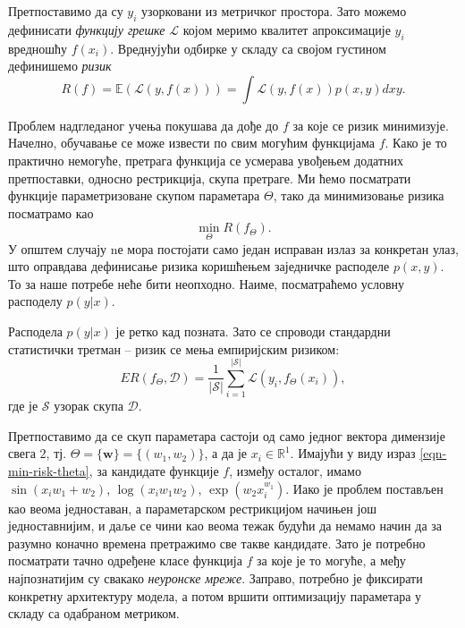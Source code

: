 \documentclass[12pt, a4paper, twoside]{book}
\numberwithin{equation}{chapter}
\numberwithin{theorem}{section}
\numberwithin{definition}{section}
\numberwithin{definitionChapter}{chapter}
\begin{document}
Претпоставимо да су $y_i$ узорковани из метричког простора. Зато можемо дефинисати
\textit{функцију грешке} $\mathcal{L}$ којом меримо квалитет апроксимације $y_i$
вредношћу $f(x_i)$. Вреднујући одбирке у складу са својом густином дефинишемо \textit{ризик}
\begin{equation}
	R(f) = \mathbb{E}(\mathcal{L}(y, f(x)))=\int\mathcal{L}(y, f(x))p(x, y)dxy.
	\label{eqn-risk}
\end{equation}

Проблем надгледаног учења покушава да дође до $f$ за које се ризик минимизује. Начелно,
обучавање се може извести по свим могућим функцијама $f$. Како је то практично немогуће,
претрага функција се усмерава увођењем додатних претпоставки, односно рестрикција, скупа
претраге. Ми ћемо посматрати функције параметризоване скупом параметара $\Theta$,
тако да минимизовање ризика посматрамо као
\begin{equation}
	\min_{\Theta}R(f_{\Theta}).
	\label{eqn-min-risk-theta}
\end{equation}
У општем случају nе мора постојати само један исправан излаз за конкретан улаз, што оправдава
дефинисање ризика коришћењем заједничке расподеле $p(x, y)$. То за наше потребе неће бити
неопходно. Наиме, посматраћемо условну расподелу $p(y\vert x)$.

Расподела $p(y\vert x)$ је ретко кад позната. Зато се спроводи стандардни статистички
третман -- ризик се мења емпиријским ризиком:
\begin{equation}
	ER(f_\Theta, \mathcal{D}) = \frac{1}{\vert \mathcal{S}\vert}\sum_{i=1}^{\vert \mathcal{S}\vert}\mathcal{L}(y_i, f_\Theta(x_i)),
\end{equation}
где је $\mathcal{S}$ узорак скупа $\mathcal{D}$.

Претпоставимо да се скуп параметара састоји од само једног вектора димензије свега $2$,
тј. $\Theta = \{\mathbf{w}\} = \{(w_1, w_2)\}$,
а да је $x_i \in \mathbb{R}^{1}$. Имајући у виду израз \ref{eqn-min-risk-theta}, за кандидате
функције $f$, између осталог, имамо $\sin(x_i w_1 + w_2)$, $\log(x_i w_1 w_2)$,
$\exp(w_2x_i^{w_1})$. Иако је проблем постављен као веома једноставан, а параметарском
рестрикцијом начињен још једноставнијим, и даље се чини као веома тежак будући да немамо
начин да за разумно коначно времена претражимо све такве кандидате. Зато је потребно посматрати
тачно одређене класе функција $f$ за које је то могуће, а међу најпознатијим су свакако
\textit{неуронске мреже}. Заправо, потребно је фиксирати конкретну архитектуру модела, а
потом вршити оптимизацију параметара у складу са одабраном метриком.
\end{document}
